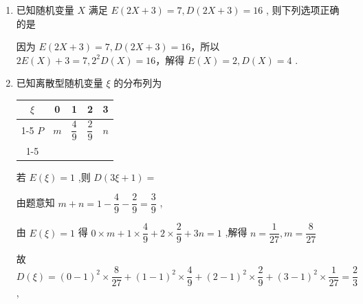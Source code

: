 \begin{enumerate}
\begin{enumerate}
\begin{jieda}
            $D\left( {\dfrac{1}{2}X}\right)  = \dfrac{1}{4}D\left( X\right)  = \dfrac{1}{4} \times  \left\lbrack  {{0.2} \times  {\left( {1.4} - 0\right) }^{2} + {0.2} \times  {\left( 1 - {1.4}\right) }^{2} + {0.6} \times  {\left( 2 - {1.4}\right) }^{2}}\right\rbrack = \dfrac{1}{4} \times  \left( {{0.392} + {0.032} + {0.216}}\right)  = {0.16}.$
        \end{jieda}

        \item 已知随机变量 $X$ 满足 $E\left( {{2X} + 3}\right)  = 7,D\left( {{2X} + 3}\right)  = {16}$ , 则下列选项正确的是
        \begin{jieda}
            因为 $E\left( {{2X} + 3}\right)  = 7,D\left( {{2X} + 3}\right)  = {16}$，所以 ${2E}\left( X\right)  + 3 = 7,{2}^{2}D\left( X\right)  = {16}$，解得 $E\left( X\right)  = 2,D\left( X\right)  = 4$ .
        \end{jieda}

        \item 已知离散型随机变量 $\xi$ 的分布列为
        
        \begin{center}
        
        \begin{tabular}{|c|c|c|c|c|}
        \hline
        $\xi$ & 0 & 1 & 2 & 3 \\
        \cline{1-5}
        $P$ & $m$ & $\dfrac{4}{9}$ & $\dfrac{2}{9}$ & $n$ \\
        \cline{1-5}
        \hline
        \end{tabular}
        
        \end{center}
        
        若 $E\left( \xi \right)  = 1$ ,则 $D\left( {{3\xi } + 1}\right)  =$
        \begin{jieda}
            由题意知 $m + n = 1 - \dfrac{4}{9} - \dfrac{2}{9} = \dfrac{3}{9}$ ,
            
            由 $E\left( \xi \right)  = 1$ 得 $0 \times  m + 1 \times  \dfrac{4}{9} + 2 \times  \dfrac{2}{9} + {3n} = 1$ ,解得 $n = \dfrac{1}{27},m = \dfrac{8}{27}$
            
            故 $D\left( \xi \right)  = {\left( 0 - 1\right) }^{2} \times  \dfrac{8}{27} + {\left( 1 - 1\right) }^{2} \times  \dfrac{4}{9} + {\left( 2 - 1\right) }^{2} \times  \dfrac{2}{9} + {\left( 3 - 1\right) }^{2} \times  \dfrac{1}{27} = \dfrac{2}{3}$ ,
            

\end{jieda}
\end{enumerate}
\end{enumerate}
